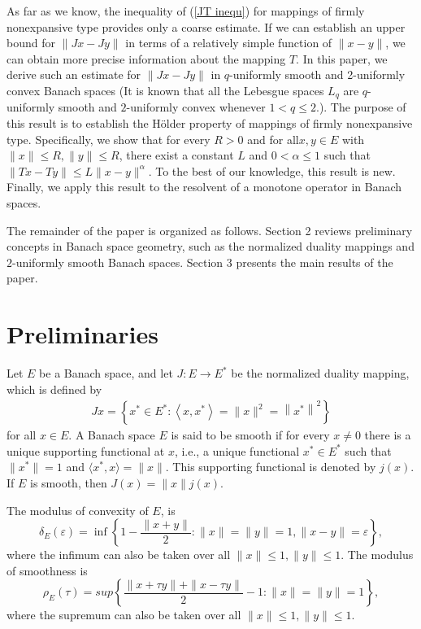 \documentclass[12pt,a4paper]{amsart}
\theoremstyle{definition}
\numberwithin{equation}{section}
\begin{document}
As far as we know, the inequality of (\ref{JT inequ}) for mappings of firmly nonexpansive type provides only a coarse estimate. If we can establish an upper bound for \(\|Jx - Jy\|\) in terms of a relatively simple function of $\|x-y\|$, we can obtain more precise information about the mapping \(T\). In this paper, we derive such an estimate for \( \|Jx - Jy\| \) in \( q \)-uniformly smooth and 2-uniformly convex Banach spaces (It is known that all the Lebesgue spaces $L_q$ are $q$-uniformly smooth and $2$-uniformly convex whenever $1<q\leq 2.$). The purpose of this result is to establish the H\"{o}lder property of mappings of firmly nonexpansive type. Specifically, we show that for every $R>0$ and for all$x,y \in E$ with $\|x\| \leq R, \|y\|\leq R$, there exist a constant \( L \) and \( 0 < \alpha \leq 1 \) such that \( \|Tx - Ty\| \leq L\|x - y\|^{\alpha} \). To the best of our knowledge, this result is new. Finally, we apply this result to the resolvent of a monotone operator in Banach spaces.

The remainder of the paper is organized as follows. Section 2 reviews preliminary concepts in Banach space geometry, such as the normalized duality mappings and $2$-uniformly smooth Banach spaces. Section 3 presents the main results of the paper. %

\section{Preliminaries}
Let $E$ be a Banach space, and let \(J: E \to E^{*}\) be the normalized duality mapping, which is defined by
\begin{align}\label{dual map}
  J x=\left\{x^{*} \in E^{*}:\left< x, x^{*}\right>=\| x\| ^{2}=\left\| x^{*}\right\| ^{2}\right\}
\end{align}
for all \(x \in E\). A Banach space $E$ is said to be smooth if for every $x\neq 0$ there is a unique supporting functional at $x$, i.e., a unique functional $x^* \in E^*$ such that $\|x^*\| = 1$ and $ \langle x^*, x\rangle = \|x\|$. This supporting functional is denoted by $j(x)$. If $E$ is smooth, then $J(x) = \|x\| j(x)$.

The modulus of convexity of \(E\), is
\[\delta_{E}(\varepsilon)=\inf \left\{1-\frac{\| x+y\| }{2}:\| x\| =\| y\| =1,\| x-y\| =\varepsilon\right\},\]
where the infimum can also be taken over all $\|x\|\leq 1, \|y\|\leq 1$. The
modulus of smoothness is
\[\rho_{E}(\tau)=sup \left\{\frac{\| x+\tau y\| +\| x-\tau y\| }{2}-1:\| x\| =\| y\| =1\right\},\]
where the supremum can also be taken over all $\|x\|\leq 1, \|y\|\leq 1$.
\end{document}
